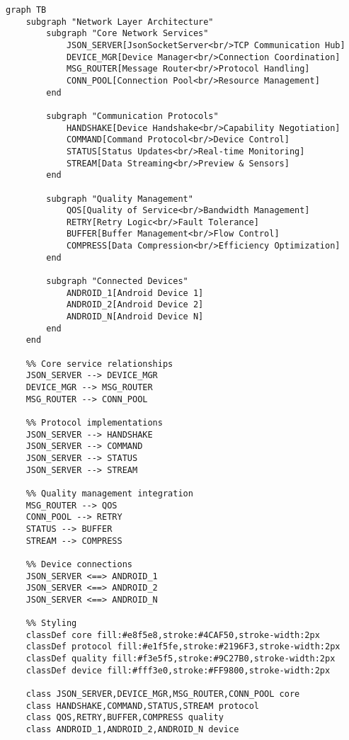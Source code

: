 \documentclass[11pt,a4paper]{article}
\begin{document}
\begin{verbatim}
graph TB
    subgraph "Network Layer Architecture"
        subgraph "Core Network Services"
            JSON_SERVER[JsonSocketServer<br/>TCP Communication Hub]
            DEVICE_MGR[Device Manager<br/>Connection Coordination]
            MSG_ROUTER[Message Router<br/>Protocol Handling]
            CONN_POOL[Connection Pool<br/>Resource Management]
        end

        subgraph "Communication Protocols"
            HANDSHAKE[Device Handshake<br/>Capability Negotiation]
            COMMAND[Command Protocol<br/>Device Control]
            STATUS[Status Updates<br/>Real-time Monitoring]
            STREAM[Data Streaming<br/>Preview & Sensors]
        end

        subgraph "Quality Management"
            QOS[Quality of Service<br/>Bandwidth Management]
            RETRY[Retry Logic<br/>Fault Tolerance]
            BUFFER[Buffer Management<br/>Flow Control]
            COMPRESS[Data Compression<br/>Efficiency Optimization]
        end

        subgraph "Connected Devices"
            ANDROID_1[Android Device 1]
            ANDROID_2[Android Device 2]
            ANDROID_N[Android Device N]
        end
    end

    %% Core service relationships
    JSON_SERVER --> DEVICE_MGR
    DEVICE_MGR --> MSG_ROUTER
    MSG_ROUTER --> CONN_POOL

    %% Protocol implementations
    JSON_SERVER --> HANDSHAKE
    JSON_SERVER --> COMMAND
    JSON_SERVER --> STATUS
    JSON_SERVER --> STREAM

    %% Quality management integration
    MSG_ROUTER --> QOS
    CONN_POOL --> RETRY
    STATUS --> BUFFER
    STREAM --> COMPRESS

    %% Device connections
    JSON_SERVER <==> ANDROID_1
    JSON_SERVER <==> ANDROID_2
    JSON_SERVER <==> ANDROID_N

    %% Styling
    classDef core fill:#e8f5e8,stroke:#4CAF50,stroke-width:2px
    classDef protocol fill:#e1f5fe,stroke:#2196F3,stroke-width:2px
    classDef quality fill:#f3e5f5,stroke:#9C27B0,stroke-width:2px
    classDef device fill:#fff3e0,stroke:#FF9800,stroke-width:2px

    class JSON_SERVER,DEVICE_MGR,MSG_ROUTER,CONN_POOL core
    class HANDSHAKE,COMMAND,STATUS,STREAM protocol
    class QOS,RETRY,BUFFER,COMPRESS quality
    class ANDROID_1,ANDROID_2,ANDROID_N device
\end{verbatim}
\end{document}
